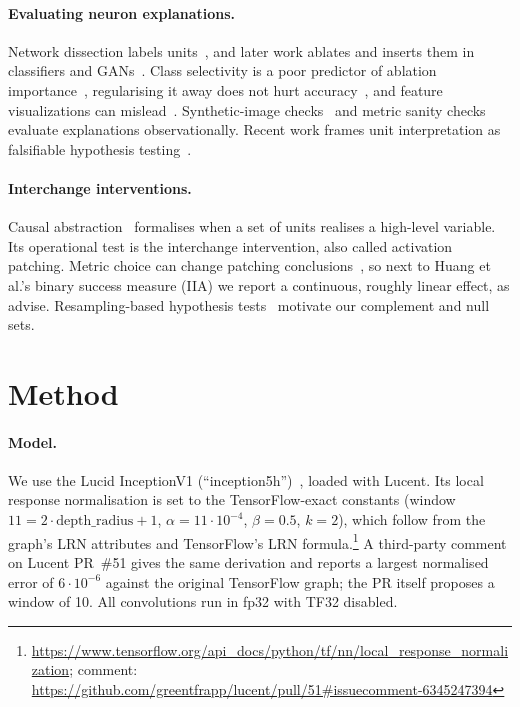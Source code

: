 \documentclass[11pt]{article}
\begin{document}
\paragraph{Evaluating neuron explanations.}
Network dissection labels units~\cite{bau2017dissection}, and later work ablates and inserts them in classifiers and GANs~\cite{bau2020units}. Class selectivity is a poor predictor of ablation importance~\cite{morcos2018single}, regularising it away does not hurt accuracy~\cite{leavitt2020selectivity}, and feature visualizations can mislead~\cite{geirhos2023trust}. Synthetic-image checks~\cite{kopf2024cosy} and metric sanity checks~\cite{oikarinen2025evaluating} evaluate explanations observationally. Recent work frames unit interpretation as falsifiable hypothesis testing~\cite{aguilarcanto2026color}.

\paragraph{Interchange interventions.}
Causal abstraction~\cite{geiger2021causal,geiger2023abstraction} formalises when a set of units realises a high-level variable. Its operational test is the interchange intervention, also called activation patching. Metric choice can change patching conclusions~\cite{zhang2024patching}, so next to Huang et al.'s binary success measure (IIA) we report a continuous, roughly linear effect, as \citet{heimersheim2024patching} advise. Resampling-based hypothesis tests~\cite{chan2022scrubbing} motivate our complement and null sets.

\section{Method}
\label{sec:method}
\paragraph{Model.}
We use the Lucid InceptionV1 (``inception5h'')~\cite{szegedy2015going}, loaded with Lucent. Its local response normalisation is set to the TensorFlow-exact constants (window $11=2\cdot\text{depth\_radius}+1$, $\alpha=11\cdot10^{-4}$, $\beta=0.5$, $k=2$), which follow from the graph's LRN attributes and TensorFlow's LRN formula.\footnote{\url{https://www.tensorflow.org/api_docs/python/tf/nn/local_response_normalization}; comment: \url{https://github.com/greentfrapp/lucent/pull/51\#issuecomment-6345247394}} A third-party comment on Lucent PR~\#51 gives the same derivation and reports a largest normalised error of $6\cdot10^{-6}$ against the original TensorFlow graph; the PR itself proposes a window of 10. All convolutions run in fp32 with TF32 disabled.
\end{document}
